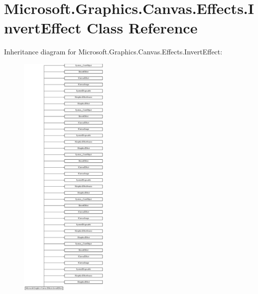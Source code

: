 \hypertarget{class_microsoft_1_1_graphics_1_1_canvas_1_1_effects_1_1_invert_effect}{}\section{Microsoft.\+Graphics.\+Canvas.\+Effects.\+Invert\+Effect Class Reference}
\label{class_microsoft_1_1_graphics_1_1_canvas_1_1_effects_1_1_invert_effect}
Inheritance diagram for Microsoft.\+Graphics.\+Canvas.\+Effects.\+Invert\+Effect\+:\begin{figure}[H]
\begin{center}
\leavevmode
\includegraphics[height=12.000000cm]{class_microsoft_1_1_graphics_1_1_canvas_1_1_effects_1_1_invert_effect}
\end{center}
\end{figure}
